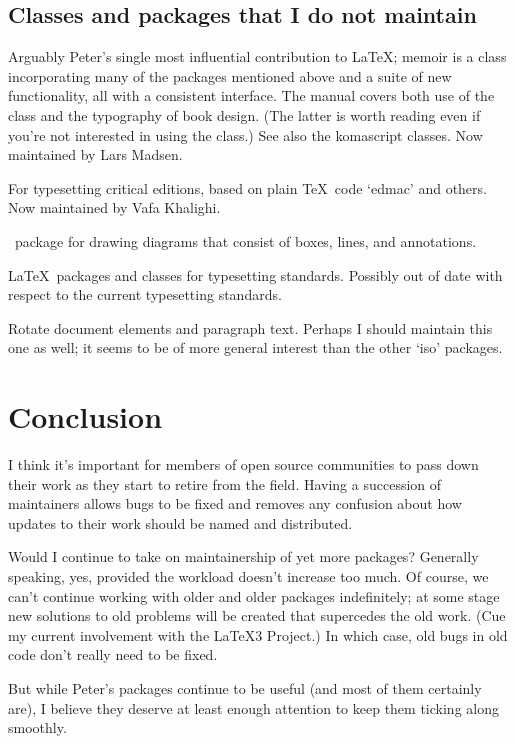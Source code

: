 \documentclass{ltugboat}
\begin{document}
\subsection{Classes and packages that I do not maintain}

\begin{description}[font=\normalfont\sffamily]
\item [memoir] Arguably Peter's single most influential contribution to \LaTeX; \textsf{memoir} is a class incorporating many of the packages mentioned above and a suite of new functionality, all with a consistent interface. The manual covers both use of the class and the typography of book design. (The latter is worth reading even if you're not interested in using the class.)
See also the \textsf{komascript} classes.
Now maintained by Lars Madsen.
\item [ledmac/ledpar/ledarab]  For typesetting critical editions, based on plain \TeX\ code `\textsf{edmac}' and others. Now maintained by Vafa Khalighi.
\item [expressg] \MP\ package for drawing diagrams that consist of boxes, lines, and annotations.
\item [iso \& iso10303] \LaTeX\ packages and classes for typesetting  standards. Possibly out of date with respect to the current typesetting standards.
\item [isorot] Rotate document elements and paragraph text. Perhaps I should maintain this one as well; it seems to be of more general interest than the other `\textsf{iso}' packages.
\end{description}

\section{Conclusion}

I think it's important for members of open source communities to pass down their work as they start to retire from the field. Having a succession of maintainers allows bugs to be fixed and removes any confusion about how updates to their work should be named and distributed.

Would I continue to take on maintainership of yet more packages? Generally speaking, yes, provided the workload doesn't increase too much. Of course, we can't continue working with older and older packages indefinitely; at some stage new solutions to old problems will be created that supercedes the old work. (Cue my current involvement with the \LaTeX3 Project.) In which case, old bugs in old code don't really need to be fixed.

But while Peter's packages continue to be useful (and most of them certainly are), I believe they deserve at least enough attention to keep them ticking along smoothly.
\end{document}
